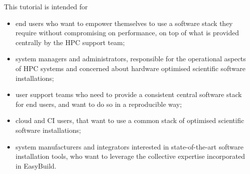 This tutorial is intended for
\begin{itemize}
    \item end users who want to empower themselves to use a software stack they require without compromising on
          performance, on top of what is provided centrally by the HPC support team;
    \item system managers and administrators, responsible for the operational aspects of HPC systems and concerned about
          hardware optimised scientific software installations;
    \item user support teams who need to provide a consistent central software stack for end users, and want to do so in
          a reproducible way;
    \item cloud and CI users, that want to use a common stack of optimised scientific software installations;
    \item system manufacturers and integrators interested in state-of-the-art software installation tools, who want to
          leverage the collective expertise incorporated in EasyBuild.
\end{itemize}
